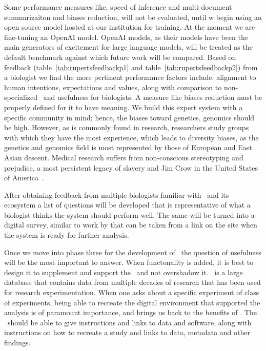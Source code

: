 Some performance measures like, speed of inference and multi-document summarizaiton and biases reduction, will not be evaluated, until w begin using an open source model hosted at our institution for training.
At the moment we are fine-tuning an OpenAI model.
OpenAI models, as their models have been the main generators of excitement for large language models, will be treated as the default benchmark against which future work will be compared.
Based on feedback (table~\ref{tab:rupertsfeedbackp1} and table~\ref{tab:rupertsfeedbackp2}) from a biologist we find the more pertinent performance factors include: alignment to human intentions, expectations and values, along with comparison to non-specialized \llms\, and usefulness for biologists.
A measure like biases reduction must be properly defined for it to have meaning.
We build this expert system with a specific community in mind; hence, the biases toward genetics, genomics should be high.
However, as is commonly found in research, researchers study groups with which they have the most experience, which leads to diversity biases, as the genetics and genomics field is most represented by those of European and East Asian descent.
Medical research suffers from non-conscious stereotyping and prejudice, a most persistent legacy of slavery and Jim Crow in the United States of America~\cite{Stone:2011}.
    

After obtaining feedback from multiple biologists familiar with \GN\ and its ecosystem a list of questions will be developed that is representative of what a biologist thinks the system should perform well. 
The same will be turned into a digital survey, similar to work by \cite{Blattgerste:2022} that can be taken from a link on the site when the system is ready for further analysis.

Once we move into phase three for the development of \project\ the question of usefulness will be the most important to answer.
When functonality is added, it is best to design it to supplement and support the \project\ and not overshadow it.
\GN\ is a large database that contains data from multiple decades of research that has been used for research experimentation.
When one asks about a specific experiment of class of experiments, being able to recreate the digital environment that supported the analysis is of paramount importance, and brings us back to the benefits of \guix.
The \project\ should be able to give instructions and links to data and software, along with instructions on how to recreate a study and links to data, metadata and other findings.



